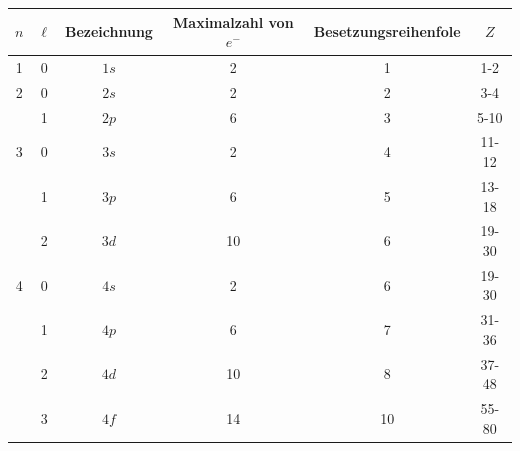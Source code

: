 	\begin{tabular}{c c c c c c}
		$n$ & $\ell$ & Bezeichnung & Maximalzahl von $e^-$ & Besetzungsreihenfole & $Z$ \\
		\hline
		1 & 0 & $1s$ & 2 & 1 & 1-2 \\
		\hline
		2 & 0 & $2s$ & 2 & 2 & 3-4 \\
		  & 1 & $2p$ & 6 & 3 & 5-10 \\
		\hline
		3 & 0 & $3s$ & 2 & 4 & 11-12 \\
		  & 1 & $3p$ & 6 & 5 & 13-18 \\
		  & 2 & $3d$ & 10 & 6 & 19-30 \\
		\hline
		4 & 0 & $4s$ & 2 & 6 & 19-30 \\
		  & 1 & $4p$ & 6 & 7 & 31-36 \\
		  & 2 & $4d$ & 10 & 8 & 37-48 \\
		  & 3 & $4f$ & 14 & 10 & 55-80 \\
	\end{tabular}